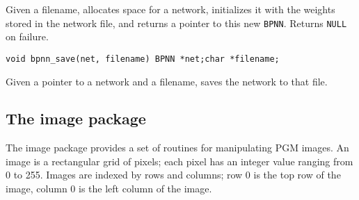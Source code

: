 \begin{description}
Given a filename, allocates space for a network, initializes it with the
weights stored in the network file, and returns a pointer to this new
{\tt BPNN}.  Returns {\tt NULL} on failure.

\item {\tt void bpnn\_save(net, filename)\newline
BPNN *net;\newline char *filename;}

Given a pointer to a network and a filename, saves the network to that
file.

\end{description}

\subsection{The image package}

The image package provides a set of routines for manipulating PGM images.
An image is a rectangular grid of pixels; each pixel has an integer value
ranging from 0 to 255.  Images are indexed by rows and columns; row 0
is the top row of the image, column 0 is the left column of the image.

